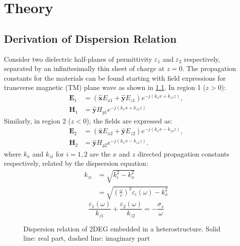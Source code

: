 \documentclass[conference, 10pt]{IEEEtran}
\renewcommand{\v}[1]{\mathbf{#1}} %
\renewcommand{\O}{\omega}  %
\newcommand{\E}{\varepsilon}  %
\renewcommand{\^}{\hat}  %
\begin{document}
\section{Theory}

\subsection{Derivation of Dispersion Relation}
%
Consider two dielectric half-planes of permittivity $\E_1$ and $\E_2$ respectively, separated by an infinitesimally thin sheet of charge at $z = 0$. The propagation constants for the materials can be found starting with field expressions for transverse magnetic (TM) plane wave as shown in \ref{}. In region 1 ($z > 0$):
%
\begin{subequations}
  \begin{align}
    \v E_1 &=  \left(\v{\^{x}} E_{x1} + \v{\^{y}} E_{z1} \right) e^{-j (k_x x + k_{z1}z)},
    \label{eq:E_1}\\
    \v H_1 &=  \v{\^{y}} H_{y1} e^{-j (k_x x + k_{z1}z)}
    \label{eq:H_1}
  \end{align}
  \label{eq:r_1}
\end{subequations}
%
Similarly, in region 2 ($z < 0$), the fields are expressed as:
%
\begin{subequations}
  \begin{align}
    \v E_2 &=  \left(\v{\^{x}} E_{x2} + \v{\^{y}} E_{z2} \right) e^{-j (k_x x - k_{z2}z)},
    \label{eq:E_2}\\
    \v H_2 &=  \v{\^{y}} H_{y2} e^{-j (k_x x - k_{z1}z)}.
    \label{eq:H_2}
  \end{align}
  \label{eq:r_2}
\end{subequations}
%
where $k_x$ and $k_{zi}$ for $i = 1,2$ are the $x$ and $z$ directed propagation constants respectively, related by the dispsersion equation:
%
\begin{equation}
  \begin{split}
    k_{zi} & = \sqrt{k_i^2 - k_x^2} \\
    & = \sqrt{\left(\frac{\O}{c}\right)^2 \E_i(\O) -  k_x^2}
  \end{split}
  \label{eq:kz}
\end{equation}
%
\begin{equation}
  \frac{\E_1(\O)}{k_{z1}} + \frac{\E_2(\O)}{k_{z2}} = -\frac{\sigma_s}{\O}
  \label{eq:disp_bas}
\end{equation}
%
\begin{figure*}[!t]
\centering
\subfloat[Case A]{
\label{fig:disp_Ga}}
\hfil
\subfloat[Case B]{
\label{fig:disp_Sto}}
  \caption{Dispersion relation of 2DEG embedded in a heterostructure. Solid line: real part, dashed line: imaginary part}
\label{fig:disp}
\end{figure*}
\end{document}
